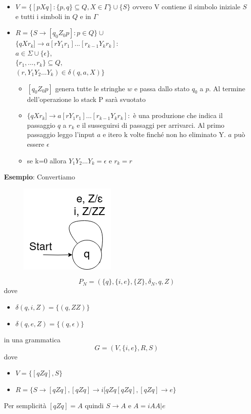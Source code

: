 \documentclass[12pt]{article}
\begin{document}
\begin{itemize}
  \item $V=\{[pXq]:\{p,q\} \subseteq Q,X \in \Gamma\} \cup \{S\}$ ovvero V contiene il simbolo iniziale $S$ e tutti i simboli in $Q$ e in $\Gamma$
  \item $R= \{S \rightarrow [q_0 Z_0 p]:p \in Q \} \cup$ \\ $\{q X r_k] \rightarrow a[r Y_1 r_1]...[r_{k-1} Y_k r_k]:$
  \\ $a \in \Sigma \cup \{\epsilon\}$,
  \\ $\{r_1,...,r_k\} \subseteq Q$, 
  \\ $(r,Y_1 Y_2...Y_k) \in \delta(q,a,X)\}$
  \begin{itemize}
      \item $[q_0 Z_0 p]$ genera tutte le stringhe $w$ e passa dallo stato $q_0$ a $p$. Al termine dell'operazione lo stack P sarà svuotato
      \item $\{q X r_k] \rightarrow a[r Y_1 r_1]...[r_{k-1} Y_k r_k]:$ è una produzione che indica il passaggio $q$ a $r_k$ e il susseguirsi di passaggi per arrivarci. Al primo passaggio leggo l'input $a$ e itero k volte finché non ho eliminato Y. $a$ può essere $\epsilon$
        \item se k=0 allora $Y_1 Y_2 ... Y_k = \epsilon$ e $r_k = r$
  \end{itemize}
\end{itemize}
\textbf{Esempio}: Convertiamo

\begin{figure}[ht]
	\includegraphics[scale = 0.4]{media/if_else.png}
	\centering
\end{figure}
\[ P_N = (\{q\}, \{i,e\}, \{Z\}, \delta_N,q,Z) \]
dove 
\begin{itemize}
  \item $\delta(q,i,Z) = \{(q,ZZ)\}$ 
  \item $\delta(q,e,Z) = \{(q,\epsilon)\}$ 
\end{itemize}
in una grammatica 
\[G=(V,\{i,e\},R,S)\]
dove 
\begin{itemize}
  \item $V=\{[qZq],S\}$
  \item $R=\{S \rightarrow [qZq],[qZq] \rightarrow i[qZq[qZq], [qZq] \rightarrow e \}$
\end{itemize}
Per semplicità $[qZq]=A$ quindi $S \rightarrow A$ e $A=iAA|e$
\end{document}
